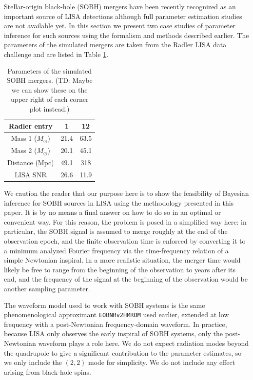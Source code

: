 \documentclass[aps,showpacs,twocolumn,prd,superscriptaddress,nofootinbib]{revtex4-1}
\newcommand{\Msol}{M_{\odot}}
\newcommand{\tdc}[1]{{\color{red} (TD: #1)}}
\begin{document}
Stellar-origin black-hole (SOBH) mergers have been recently recognized as an
important source of LISA detections \cite{Sesana16} although full parameter
estimation studies are not available yet. In this section we present two case
studies of parameter inference for such sources using the formalism and methods
described earlier. The parameters of the simulated mergers are taken from the
Radler LISA data challenge and are listed in Table \ref{table:sobh_params}.
\begin{table}
	\begin{tabular}{|c||c|c|}
		\hline
		Radler entry 		& 1 	& 12   \\
		\hline
		Mass 1 ($\Msol$) 	& 21.4	& 63.5 \\
		\hline
		Mass 2 ($\Msol$) 	& 20.1	& 45.1 \\
		\hline
		Distance (Mpc) 		& 49.1	& 318  \\
		\hline
		LISA SNR 			& 26.6	& 11.9 \\
		\hline
	\end{tabular}
	\caption{Parameters of the simulated SOBH mergers. \tdc{Maybe we can show
			 these on the upper right of each corner plot instead.}}
	\label{table:sobh_params}
\end{table}

We caution the reader that our purpose here is to show the feasibility of
Bayesian inference for SOBH sources in LISA using the methodology presented in
this paper. It is by no means a final answer on how to do so in an optimal or
convenient way.  For this reason, the problem is posed in a simplified
way here: in particular, the SOBH signal is assumed to merge roughly at the end of
the observation epoch, and the finite observation time is enforced by
converting it to a minimum analyzed Fourier frequency via the time-frequency
relation of a simple Newtonian inspiral. In a more realistic situation, the
merger time would likely be free to range from the beginning of the observation
to years after its end, and the frequency of the signal at the beginning of the
observation would be another sampling parameter.

The waveform model used to work with SOBH systems is the same phenomenological
approximant \texttt{EOBNRv2HMROM} used earlier, extended at low frequency with a post-Newtonian
frequency-domain waveform. In practice, because LISA only observes the early
inspiral of SOBH systems, only the post-Newtonian waveform plays a role here.
We do not expect radiation modes beyond the quadrupole to give a significant
contribution to the parameter estimates, so we only include the $(2,2)$ mode
for simplicity. We do not include any effect arising from black-hole spins.
\end{document}
